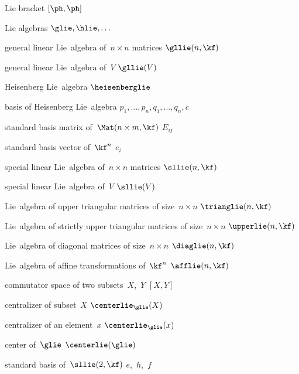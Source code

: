 
{Lie bracket}
{$[\ph, \ph]$}

{Lie algebras}
{$\glie, \hlie, \dotsc$}

{general linear Lie~algebra of~$n \times n$ matrices}
{$\gllie(n, \kf)$}

{general linear Lie~algebra of~$V$}
{$\gllie(V)$}

{Heisenberg Lie~algebra}
{$\heisenberglie$}

{basis of Heisenberg Lie~algebra}
{$p_1, \dotsc, p_n, q_1, \dotsc, q_n, c$}

{standard basis matrix of~$\Mat(n \times m, \kf)$}
{$E_{ij}$}

{standard basis vector of~$\kf^n$}
{$e_i$}

{special linear Lie~algebra of~$n \times n$ matrices}
{$\sllie(n, \kf)$}

{special linear Lie~algebra of~$V$}
{$\sllie(V)$}

{Lie~algebra of upper triangular matrices of size~$n \times n$}
{$\trianglie(n, \kf)$}

{Lie~algebra of strictly upper triangular matrices of size~$n \times n$}
{$\upperlie(n, \kf)$}

{Lie~algebra of diagonal matrices of size~$n \times n$}
{$\diaglie(n, \kf)$}

{Lie~algebra of affine transformations of~$\kf^n$}
{$\afflie(n, \kf)$}

{commutator space of two subsets~$X$,~$Y$}
{$[X, Y]$}

{centralizer of subset~$X$}
{$\centerlie_{\glie}(X)$}

{centralizer of an element~$x$}
{$\centerlie_{\glie}(x)$}

{center of~$\glie$}
{$\centerlie(\glie)$}

{standard basis of~$\sllie(2, \kf)$}
{$e$,~$h$,~$f$}

